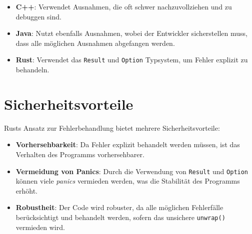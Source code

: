 \begin{itemize}
    \item \textbf{C++}: Verwendet Ausnahmen, die oft schwer nachzuvollziehen und zu debuggen sind.
    \item \textbf{Java}: Nutzt ebenfalls Ausnahmen, wobei der Entwickler sicherstellen muss, dass alle möglichen Ausnahmen abgefangen werden.
    \item \textbf{Rust}: Verwendet das \texttt{Result} und \texttt{Option} Typsystem, um Fehler explizit zu behandeln.
\end{itemize}

\section{Sicherheitsvorteile}
Rusts Ansatz zur Fehlerbehandlung bietet mehrere Sicherheitsvorteile:

\begin{itemize}
    \item \textbf{Vorhersehbarkeit}: Da Fehler explizit behandelt werden müssen, ist das Verhalten des Programms vorhersehbarer.
    \item \textbf{Vermeidung von Panics}: Durch die Verwendung von \texttt{Result} und \texttt{Option} können viele \textit{\glspl{panic}} vermieden werden, was die Stabilität des Programms erhöht.
    \item \textbf{Robustheit}: Der Code wird robuster, da alle möglichen Fehlerfälle berücksichtigt und behandelt werden, sofern das unsichere \texttt{unwrap()} vermieden wird.
\end{itemize}
\noindent


